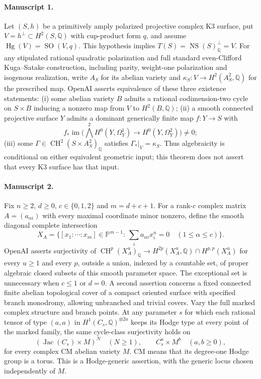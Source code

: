 \documentclass[11pt]{article}
\begin{document}
\paragraph{Manuscript 1.}
Let $(S,h)$ be a primitively amply polarized projective complex K3 surface, put $V=h^\perp\subset H^2(S,\mathbb Q)$ with cup-product form $q$, and assume $\operatorname{Hg}(V)=\operatorname{SO}(V,q)$. This hypothesis implies $T(S)=\operatorname{NS}(S)_{\mathbb Q}^{\perp}=V$. For any stipulated rational quadratic polarization and full standard even-Clifford Kuga--Satake construction, including parity, weight-one polarization and isogenous realization, write $A_S$ for its abelian variety and $\kappa_S:V\to H^2(A_S^2,\mathbb Q)$ for the prescribed map. OpenAI asserts equivalence of these three existence statements: (i) some abelian variety $B$ admits a rational codimension-two cycle on $S\times B$ inducing a nonzero map from $V$ to $H^2(B,\mathbb Q)$; (ii) a smooth connected projective surface $Y$ admits a dominant generically finite map $f:Y\to S$ with
\[
f_*\operatorname{im}\bigl(\bigwedge^2 H^0(Y,\Omega_Y^1)\longrightarrow H^0(Y,\Omega_Y^2)\bigr)\ne0;
\]
(iii) some $\Gamma\in\operatorname{CH}^2(S\times A_S^2)_{\mathbb Q}$ satisfies $\Gamma_*|_V=\kappa_S$. Thus algebraicity is conditional on either equivalent geometric input; this theorem does not assert that every K3 surface has that input.

\paragraph{Manuscript 2.}
Fix $n\ge2$, $d\ge0$, $c\in\{0,1,2\}$ and $m=d+c+1$. For a rank-$c$ complex matrix $A=(a_{\alpha i})$ with every maximal coordinate minor nonzero, define the smooth diagonal complete intersection
\[
X_A=\{[x_1:\cdots:x_m]\in\mathbb P^{m-1}:\ \sum_i a_{\alpha i}x_i^n=0\quad(1\le\alpha\le c)\}.
\]
OpenAI asserts surjectivity of $\operatorname{CH}^p(X_A^u)_{\mathbb Q}\to H^{2p}(X_A^u,\mathbb Q)\cap H^{p,p}(X_A^u)$ for every $u\ge1$ and every $p$, outside a union, indexed by a countable set, of proper algebraic closed subsets of this smooth parameter space. The exceptional set is unnecessary when $c\le1$ or $d=0$.
A second assertion concerns a fixed connected finite abelian topological cover of a compact oriented surface with specified branch monodromy, allowing unbranched and trivial covers. Vary the full marked complex structure and branch points. At any parameter $s$ for which each rational tensor of type $(a,a)$ in $H^1(C_s,\mathbb Q)^{\otimes 2a}$ keeps its Hodge type at every point of the marked family, the same cycle-class surjectivity holds on
\[
(\operatorname{Jac}(C_s)\times M)^N\quad(N\ge1),\qquad C_s^a\times M^b\quad(a,b\ge0),
\]
for every complex CM abelian variety $M$. CM means that its degree-one Hodge group is a torus. This is a Hodge-generic assertion, with the generic locus chosen independently of $M$.
\end{document}
